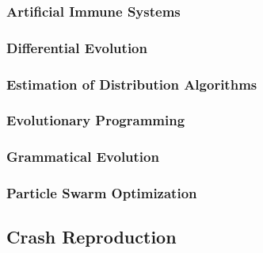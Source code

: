       \subsubsection{Artificial Immune Systems}
      \subsubsection{Differential Evolution}
      \subsubsection{Estimation of Distribution Algorithms}
      \subsubsection{Evolutionary Programming}
      \subsubsection{Grammatical Evolution}
      \subsubsection{Particle Swarm Optimization}
    \subsection{Crash Reproduction}
    \label{sec:future:beacon}
      \Blindtext
